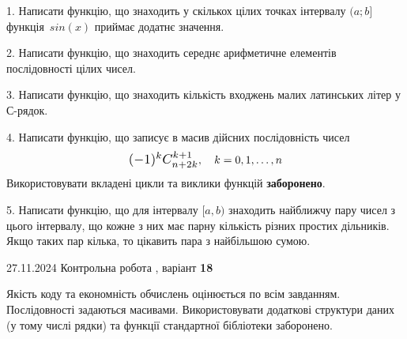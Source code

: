 \documentclass[12pt, ukrainian]{article}
\begin{document}
{{{{{{{{{{{{{{{{{\begin {large}
1. Написати функцію, що знаходить у скількох цілих точках інтервалу $(a; b]$ функція~$sin(x)$ приймає додатнє значення.

\vspace{2mm}


2. Написати функцію, що знаходить середнє арифметичне елементів послідовності цілих чисел.

\vspace{2mm}


3. Написати функцію, що знаходить кількість входжень малих латинських літер у С-рядок.

\vspace{2mm}


4. 
Написати функцію, що записує в масив дійсних послідовність чисел
$$\scalebox{1.2}{$(-1)^{k}C_{n+2k}^{k+1}$}, \quad k=0,1,\ldots,n$$
Використовувати вкладені цикли та виклики функцій \textbf{заборонено}.

\vspace{2mm}


5. Написати функцію, що для інтервалу $[a, b)$ знаходить найближчу пару чисел з цього інтервалу, що кожне з них має парну кількість різних простих дільників. Якщо таких пар кілька, то цікавить пара з найбільшою сумою.

\vspace{2mm}

\end{large}
\vspace{35mm}


{{27.11.2024 Контрольна робота , варіант  \No \textbf { 18 }\par}}


{
Якість коду та економність обчислень оцінюється по всім завданням. Послідовності задаються масивами. Використовувати додаткові структури даних (у тому числі рядки) та функції стандартної бібліотеки заборонено.

}}}}}}}}}}}}}}}}}}
\end{document}
